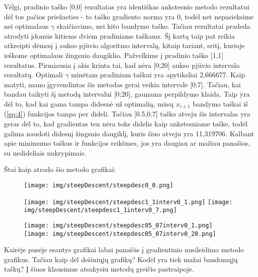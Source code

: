 \documentclass{article}
\begin{document}
Vėlgi, pradinio taško [0,0] rezultatas yra identiškas ankstesnio metodo rezultatui dėl tos pačios priežasties - to taško gradiento norma yra 0, todėl net nepasieksime nei optimalaus $\gamma$ skaičiavimo, nei kito bandymo taško. Tačiau rezultatai pradeda atrodyti įdomūs kitiems dviem pradiniams taškams. Šį kartą taip pat reikia atkreipti dėmesį į aukso pjūvio algoritmo intervalą, kitaip tariant, sritį, kurioje ieškome optimalaus žingsnio daugiklio. Pažvelkime į pradinio taško [1,1] rezultatus. Pirmiausia į akis krinta tai, kad nėra [0;20] aukso pjūvio intervalo rezultatų. Optimali $\gamma$ minėtam pradiniam taškui yra apytiksliai 2,666677. Kaip matyti, mano įgyvendintas šis metodas gerai veikia intervale [0;7]. Tačiau, kai bandau taikyti šį metodą intervalui [0;20], gaunama perpildymo klaida. Taip yra dėl to, kad kai gama tampa didesnė už optimalią, mūsų $x_{i+1}$ bandymo taškai iš (\ref{eq:4}) funkcijos tampa per dideli. Tačiau [0.5,0.7] taško atveju šis intervalas yra geras dėl to, kad gradientas ten nėra toks didelis kaip ankstesniame taške, todėl galima naudoti didesnį žingsnio daugiklį, kuris šiuo atveju yra 11,319706. Kalbant apie minimumo taškus ir funkcijos reikšmes, jos yra daugiau ar mažiau panašios, su nedideliais nukrypimais.

Štai kaip atrodo šio metodo grafikai:
\begin{figure}[H]
    \begin{adjustbox}{margin=0pt,center}
        \texttt{[image: img/steepDescent/steepdesc0\_0.png]}
    \end{adjustbox}
\end{figure}
\begin{figure}[H]
    \begin{adjustbox}{margin=0pt,center}
        \texttt{[image: img/steepDescent/steepdesc1\_1interv0\_1.png]}
        \texttt{[image: img/steepDescent/steepdesc1\_1interv0\_7.png]}
    \end{adjustbox}
\end{figure}
\begin{figure}[H]
    \begin{adjustbox}{margin=0pt,center}
        \texttt{[image: img/steepDescent/steepdesc05\_07interv0\_1.png]}
        \texttt{[image: img/steepDescent/steepdesc05\_07interv0\_20.png]}
    \end{adjustbox}
\end{figure}
Kairėje pusėje esantys grafikai labai panašūs į gradientinio nusileidimo metodo grafikus. Tačiau kaip dėl dešiniųjų grafikų? Kodėl yra tiek mažai bandomųjų taškų? Į šiuos klausimus atsakysiu metodų greičio pastraipoje.
\end{document}
